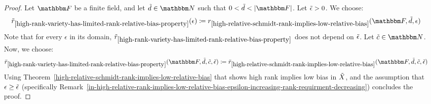 \begin{proof}
    Let $\basefield$ be a finite field, and let $\varietydeg \in \naturalnumbersset$ such that $0 < \varietydeg < \abs{\basefield}$.
    Let ${\tilde{\epsilon}} > 0$.
    We choose:
    \[
        \rankbiasfunc_{\ref{high-rank-variety-has-limited-rank-relative-bias-property}}(\epsilon) \definedas
        \rankval_{\ref{high-relative-schmidt-rank-implies-low-relative-bias}}(\basefield, \varietydeg, \epsilon)
    \]
    Note that for every $\epsilon$ in its domain, ${\tilde{r}}_{\ref{high-rank-variety-has-limited-rank-relative-bias-property}}$ does not depend on ${\tilde{\epsilon}}$.
    Let $\varietypolycount \in \naturalnumbersset$.
    Now, we choose:
    \[
        \varietyrankval_{\ref{high-rank-variety-has-limited-rank-relative-bias-property}}(\basefield, \varietydeg, \varietypolycount, \epsilonlimitedrankbias) \definedas
        \varietyrankval_{\ref{high-relative-schmidt-rank-implies-low-relative-bias}}(\basefield, \varietydeg, \varietypolycount, \epsilonlimitedrankbias)
    \]
    Using Theorem~\ref{high-relative-schmidt-rank-implies-low-relative-bias} that shows high rank implies low bias in ${\tilde{X}}$,
    and the assumption that $\epsilon \geq {\tilde{\epsilon}}$ (specifically Remark~\ref{in-high-relative-rank-implies-low-relative-bias-epsilon-increasing-rank-requirment-decreasing})
    concludes the proof.
\end{proof}

